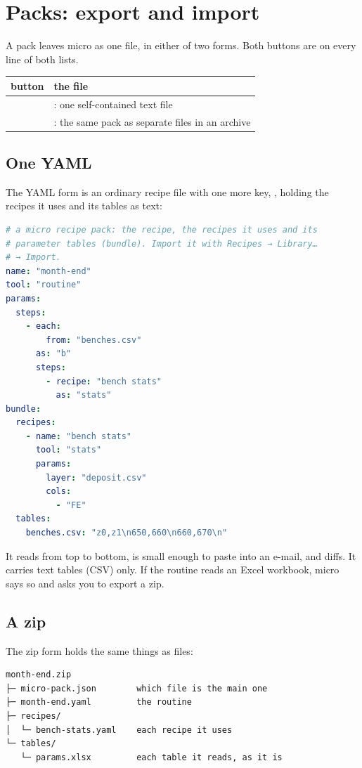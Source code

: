 \section{Packs: export and import}\label{sec:library-export}
A pack leaves micro as one file, in either of two forms. Both buttons are on every line of both lists.

\begin{tabularx}{\linewidth}{@{}lL@{}}\toprule
button & the file \\ \midrule
{} & : one self-contained text file \\
 & : the same pack as separate files in an archive \\
\bottomrule
\end{tabularx}

\subsection{One YAML}
The YAML form is an ordinary recipe file with one more key, , holding the recipes it uses and its tables as text:

\begin{lstlisting}[language=yaml]
# a micro recipe pack: the recipe, the recipes it uses and its
# parameter tables (bundle). Import it with Recipes → Library…
# → Import.
name: "month-end"
tool: "routine"
params:
  steps:
    - each:
        from: "benches.csv"
      as: "b"
      steps:
        - recipe: "bench stats"
          as: "stats"
bundle:
  recipes:
    - name: "bench stats"
      tool: "stats"
      params:
        layer: "deposit.csv"
        cols:
          - "FE"
  tables:
    benches.csv: "z0,z1\n650,660\n660,670\n"
\end{lstlisting}

It reads from top to bottom, is small enough to paste into an e-mail, and diffs. It carries text tables (CSV) only. If the routine reads an Excel workbook, micro says so and asks you to export a zip.

\subsection{A zip}
The zip form holds the same things as files:

\begin{lstlisting}
month-end.zip
├─ micro-pack.json        which file is the main one
├─ month-end.yaml         the routine
├─ recipes/
│  └─ bench-stats.yaml    each recipe it uses
└─ tables/
   └─ params.xlsx         each table it reads, as it is
\end{lstlisting}


